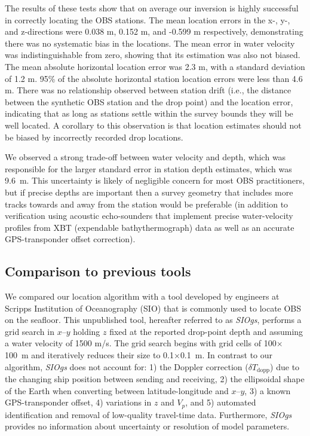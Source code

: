 \documentclass[10pt,titlepage]{article}
\begin{document}
The results of these tests show that on average our inversion is highly successful in correctly locating the OBS stations. The mean location errors in the x-, y-, and z-directions were 0.038 m, 0.152 m, and -0.599 m respectively, demonstrating there was no systematic bias in the locations. The mean error in water velocity was indistinguishable from zero, showing that its estimation was also not biased. The mean absolute horizontal location error was 2.3 m, with a standard deviation of 1.2 m. 95\% of the absolute horizontal station location errors were less than 4.6 m. There was no relationship observed between station drift (i.e., the distance between the synthetic OBS station and the drop point) and the location error, indicating that as long as stations settle within the survey bounds they will be well located. A corollary to this observation is that location estimates should not be biased by incorrectly recorded drop locations. 

We observed a strong trade-off between water velocity and depth, which was responsible for the larger standard error in station depth estimates, which was \mbox{9.6~m}. This uncertainty is likely of negligible concern for most OBS practitioners, but if precise depths are important then a survey geometry that includes more tracks towards and away from the station would be preferable (in addition to verification using acoustic echo-sounders that implement precise water-velocity profiles from XBT (expendable bathythermograph) data as well as an accurate GPS-transponder offset correction).

\subsection{Comparison to previous tools} \label{sec:Comparison_to_previous_tools}

We compared our location algorithm with a tool developed by engineers at Scripps Institution of Oceanography (SIO) that is commonly used to locate OBS on the seafloor. This unpublished tool, hereafter referred to as \textit{SIOgs}, performs a grid search in $x$--$y$ holding $z$ fixed at the reported drop-point depth and assuming a water velocity of 1500 m/s. The grid search begins with grid cells of 100$\times$100~m and iteratively reduces their size to 0.1$\times$0.1~m. In contrast to our algorithm, \textit{SIOgs} does not account for: 1) the Doppler correction ($\delta T_{\text{dopp}}$) due to the changing ship position between sending and receiving, 2) the ellipsoidal shape of the Earth when converting between latitude-longitude and $x$--$y$, 3) a known GPS-transponder offset, 4) variations in $z$ and $V_p$, and 5) automated identification and removal of low-quality travel-time data. Furthermore, \textit{SIOgs} provides no information about uncertainty or resolution of model parameters.  
\end{document}
